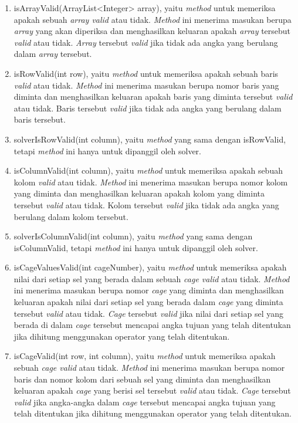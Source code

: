 \begin{enumerate}
\item isArrayValid(ArrayList<Integer> array), yaitu \textit{method} untuk memeriksa apakah sebuah \textit{array valid} atau tidak. \textit{Method} ini menerima masukan berupa \textit{array} yang akan diperiksa dan menghasilkan keluaran apakah \textit{array} tersebut \textit{valid} atau tidak. \textit{Array} tersebut \textit{valid} jika tidak ada angka yang berulang dalam \textit{array} tersebut.
\item isRowValid(int row), yaitu \textit{method} untuk memeriksa apakah sebuah baris \textit{valid} atau tidak. \textit{Method} ini menerima masukan berupa nomor baris yang diminta dan menghasilkan keluaran apakah baris yang diminta tersebut \textit{valid} atau tidak. Baris tersebut \textit{valid} jika tidak ada angka yang berulang dalam baris tersebut.
\item solverIsRowValid(int column), yaitu \textit{method} yang sama dengan isRowValid, tetapi \textit{method} ini hanya untuk dipanggil oleh solver.
\item isColumnValid(int column), yaitu \textit{method} untuk memeriksa apakah sebuah kolom \textit{valid} atau tidak. \textit{Method} ini menerima masukan berupa nomor kolom yang diminta dan menghasilkan keluaran apakah kolom yang diminta tersebut \textit{valid} atau tidak. Kolom tersebut \textit{valid} jika tidak ada angka yang berulang dalam kolom tersebut.
\item solverIsColumnValid(int column), yaitu \textit{method} yang sama dengan isColumnValid, tetapi \textit{method} ini hanya untuk dipanggil oleh solver.
\item isCageValuesValid(int cageNumber), yaitu \textit{method} untuk memeriksa apakah nilai dari setiap sel yang berada dalam sebuah \textit{cage valid} atau tidak. \textit{Method} ini menerima masukan berupa nomor \textit{cage} yang diminta dan menghasilkan keluaran apakah nilai dari setiap sel yang berada dalam \textit{cage} yang diminta tersebut \textit{valid} atau tidak. \textit{Cage} tersebut \textit{valid} jika nilai dari setiap sel yang berada di dalam \textit{cage} tersebut mencapai angka tujuan yang telah ditentukan jika dihitung menggunakan operator yang telah ditentukan.
\item isCageValid(int row, int column), yaitu \textit{method} untuk memeriksa apakah sebuah \textit{cage valid} atau tidak. \textit{Method} ini menerima masukan berupa nomor baris dan nomor kolom dari sebuah sel yang diminta dan menghasilkan keluaran apakah \textit{cage} yang berisi sel tersebut \textit{valid} atau tidak. \textit{Cage} tersebut \textit{valid} jika angka-angka dalam \textit{cage} tersebut mencapai angka tujuan yang telah ditentukan jika dihitung menggunakan operator yang telah ditentukan.

\end{enumerate}
